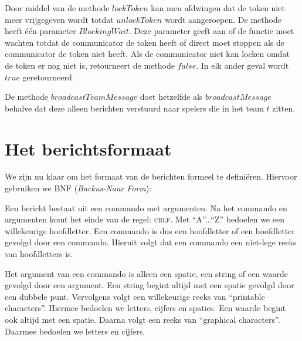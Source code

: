 \documentclass[a4paper,11pt, twoside]{article}
\begin{document}
Door middel van de methode $lockToken$ kan men afdwingen dat de token niet meer vrijgegeven wordt totdat $unlockToken$ wordt aangeroepen. De methode heeft \'e\'en parameter $BlockingWait$. Deze parameter geeft aan of de functie moet wachten totdat de communicator de token heeft of direct moet stoppen als de communicator de token niet heeft. Als de communicator niet kan locken omdat de token er nog niet is, retourneert de methode $false$. In elk ander geval wordt $true$ geretourneerd.

De methode $broadcastTeamMessage$ doet hetzelfde als $broadcastMessage$ behalve dat deze alleen berichten verstuurd naar spelers die in het team $t$ zitten.

    \section{Het berichtsformaat}
    \label{sec:protocol}
    We zijn nu klaar om het formaat van de berichten formeel te defini\"eren. Hiervoor gebruiken we BNF (\emph{Backus-Naur Form}):
	
	\begin{center} \end{center}

    Een bericht bestaat uit een commando met argumenten. Na het commando en argumenten komt het einde van de regel: \textsc{crlf}. Met ``A''...``Z'' bedoelen we een willekeurige hoofdletter. Een commando is dus een hoofdletter of een hoofdletter gevolgd door een commando. Hieruit volgt dat een commando een niet-lege reeks van hoofdletters is.

    Het argument van een commando is alleen een spatie, een string of een waarde gevolgd door een argument. Een string begint altijd met een spatie gevolgd door een dubbele punt. Vervolgens volgt een willekeurige reeks van ``printable characters''. Hiermee bedoelen we letters, cijfers en spaties. Een waarde begint ook altijd met een spatie. Daarna volgt een reeks van ``graphical characters''. Daarmee bedoelen we letters en cijfers.
\end{document}
